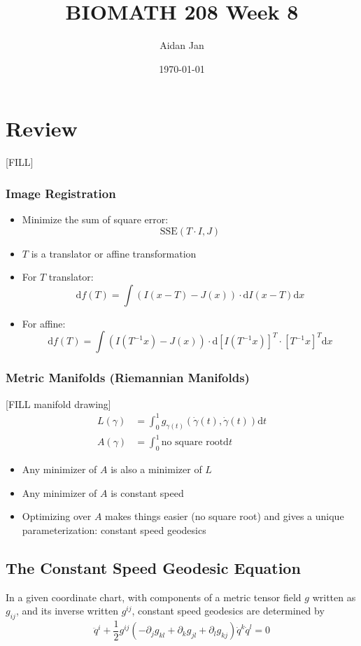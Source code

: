 \documentclass[10pt]{article}
\title{BIOMATH 208 Week 8}
\author{Aidan Jan}
\date{\today}
\newcommand{\dd}{\text{d}}
\begin{document}
\maketitle
\section{Review}
[FILL]

\subsubsection*{Image Registration}
\begin{itemize}
	\item Minimize the sum of square error:
	\[\text{SSE} (T \cdot I, J)\]
    \item $T$ is a translator or affine transformation
    \item For $T$ translator:
    \[\dd f(T) = \int(I(x - T) - J(x)) \cdot \dd I(x - T) \dd x\]
    \item For affine:
    \[\dd f(T) = \int(I(T^{-1}x) - J(x)) \cdot \dd[I(T^{-1}x)]^T \cdot [T^{-1} x]^T \dd x\]
\end{itemize}

\subsubsection*{Metric Manifolds (Riemannian Manifolds)}
[FILL manifold drawing]
\begin{align*}
    L(\gamma) &= \int_0^1 g_{\gamma(t)} (\dot{\gamma} (t), \dot{\gamma}(t)) \dd t\\
    A(\gamma) &= \int_0^1 \text{no square root} \dd t
\end{align*}
\begin{itemize}
	\item Any minimizer of $A$ is also a minimizer of $L$
	\item Any minimizer of $A$ is constant speed
	\item Optimizing over $A$ makes things easier (no square root) and gives a unique parameterization: constant speed geodesics
\end{itemize}

\subsection*{The Constant Speed Geodesic Equation}
In a given coordinate chart, with components of a metric tensor field $g$ written as $g_{ij}$, and its inverse written $g^{ij}$, constant speed geodesics are determined by
\[\ddot{q}^i + \frac{1}{2} g^{ij} (-\partial_j g_{kl} + \partial_k g_{jl} + \partial_l g_{kj}) \dot{q}^k \dot{q}^l = 0\]
\end{document}
